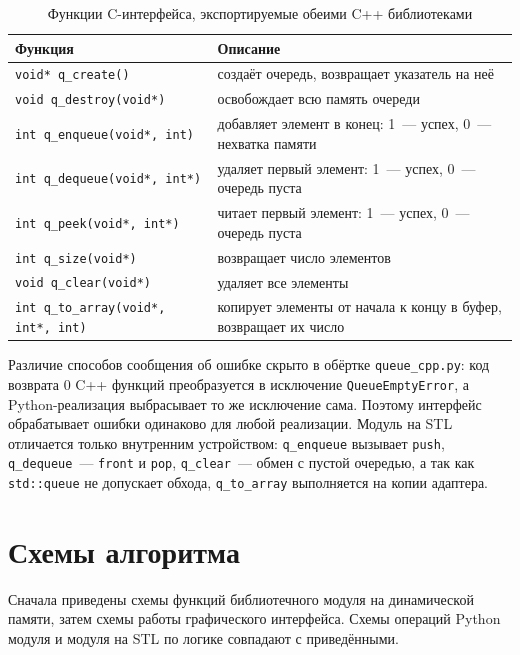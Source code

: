 \documentclass[oneside,a4paper,14pt]{extarticle} %
\begin{document}
\begin{table}[H]
\caption{Функции C-интерфейса, экспортируемые обеими C++ библиотеками}
\centering\small\singlespacing
\begin{tabular}{|p{5.2cm}|p{9.8cm}|}\hline
\textbf{Функция} & \textbf{Описание}\\\hline
\texttt{void* q\_create()} & создаёт очередь, возвращает указатель на неё\\\hline
\texttt{void q\_destroy(void*)} & освобождает всю память очереди\\\hline
\texttt{int q\_enqueue(void*, int)} & добавляет элемент в конец: 1~--- успех, 0~--- нехватка памяти\\\hline
\texttt{int q\_dequeue(void*, int*)} & удаляет первый элемент: 1~--- успех, 0~--- очередь пуста\\\hline
\texttt{int q\_peek(void*, int*)} & читает первый элемент: 1~--- успех, 0~--- очередь пуста\\\hline
\texttt{int q\_size(void*)} & возвращает число элементов\\\hline
\texttt{void q\_clear(void*)} & удаляет все элементы\\\hline
\texttt{int q\_to\_array(void*, int*, int)} & копирует элементы от начала к концу в буфер, возвращает их число\\\hline
\end{tabular}
\end{table}
Различие способов сообщения об ошибке скрыто в обёртке \texttt{queue\_cpp.py}: код возврата 0 C++ функций преобразуется в исключение \texttt{QueueEmptyError}, а Python-реализация выбрасывает то же исключение сама. Поэтому интерфейс обрабатывает ошибки одинаково для любой реализации. Модуль на STL отличается только внутренним устройством: \texttt{q\_enqueue} вызывает \texttt{push}, \texttt{q\_dequeue}~--- \texttt{front} и \texttt{pop}, \texttt{q\_clear}~--- обмен с пустой очередью, а так как \texttt{std::queue} не допускает обхода, \texttt{q\_to\_array} выполняется на копии адаптера.

\clearpage
\section{Схемы алгоритма}
Сначала приведены схемы функций библиотечного модуля на динамической памяти, затем схемы работы графического интерфейса. Схемы операций Python модуля и модуля на STL по логике совпадают с приведёнными.
\end{document}
